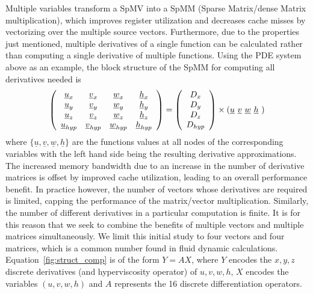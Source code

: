 \documentclass{sig-alternate}
\begin{document}
Multiple variables transform a SpMV into a SpMM (Sparse Matrix/dense Matrix multiplication), which improves register utilization and decreases cache
misses by vectorizing over the multiple source vectors. Furthermore, due to the properties just mentioned, multiple derivatives of a single function can be calculated rather than computing a single derivative of multiple functions. Using the PDE system above as an example, the block structure of the SpMM for computing all derivatives needed is %
\begingroup
\everymath{\footnotesize}
\scriptsize
\begin{equation}
   \left( \begin{array}{cccc}
    \underline{u}_x     & \underline{v}_x     & \underline{w}_x     & \underline{h}_x \\
    \underline{u}_y     & \underline{v}_y     & \underline{w}_y     & \underline{h}_y \\
    \underline{u}_z     & \underline{v}_z     & \underline{w}_z     & \underline{h}_z \\
    \underline{u}_{hyp} & \underline{v}_{hyp} & \underline{w}_{hyp} & \underline{h}_{hyp}
  \end{array} \right)
  = \left(
  \begin{array}{c}
    D_{x}\\ D_{y}\\ D_{z}\\ D_{hyp}
  \end{array}\right)
  \times \left(\underline{u} \,\, \underline{v} \,\, \underline{w} \,\, \underline{h} \,\,\right) 
  \vspace{-1ex}
  \label{fig:struct_comp}
\end{equation}
\endgroup
where $\{\underline{u},\underline{v}, \underline{w}, \underline{h}\}$ are the functions values at all nodes of the corresponding variables with the left hand side being the resulting derivative approximations. The increased memory bandwidth due to an increase in the number of derivative matrices is offset by improved cache utilization, leading to an overall performance benefit. In practice however, the number of vectors whose derivatives are required is limited, capping the performance of the matrix/vector multiplication. Similarly, the number of different derivatives in a particular computation is finite. It is for this reason that we seek to combine the benefits of multiple vectors and multiple matrices simultaneously. We limit this initial study to four vectors and four matrices, which is a common number found in fluid dynamic calculations. Equation~\ref{fig:struct_comp} is of the form $Y=AX$, where $Y$ encodes the $x,y,z$ discrete derivatives (and hyperviscosity operator) of $u,v,w,h$, $X$ encodes the variables $(u,v,w,h)$ and $A$ represents the 16 discrete differentiation operators. 
\end{document}
